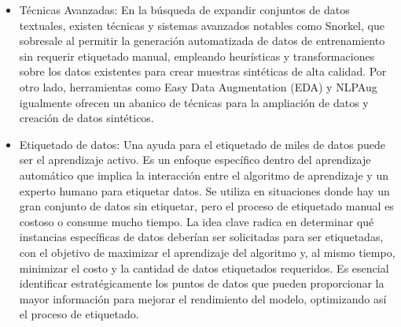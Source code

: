 \begin{itemize}
	\item Técnicas Avanzadas: En la búsqueda de expandir conjuntos de datos textuales, existen técnicas y sistemas avanzados notables como Snorkel, que sobresale al permitir la generación automatizada de datos de entrenamiento sin requerir etiquetado manual, empleando heurísticas y transformaciones sobre los datos existentes para crear muestras sintéticas de alta calidad. Por otro lado, herramientas como Easy Data Augmentation (EDA) y NLPAug igualmente ofrecen un abanico de técnicas para la ampliación de datos y creación de datos sintéticos.
	
	\item Etiquetado de datos: Una ayuda para el etiquetado de miles de datos puede ser el aprendizaje activo. Es un enfoque específico dentro del aprendizaje automático que implica la interacción entre el algoritmo de aprendizaje y un experto humano para etiquetar datos. Se utiliza en situaciones donde hay un gran conjunto de datos sin etiquetar, pero el proceso de etiquetado manual es costoso o consume mucho tiempo. La idea clave radica en determinar qué instancias específicas de datos deberían ser solicitadas para ser etiquetadas, con el objetivo de maximizar el aprendizaje del algoritmo y, al mismo tiempo, minimizar el costo y la cantidad de datos etiquetados requeridos. Es esencial identificar estratégicamente los puntos de datos que pueden proporcionar la mayor información para mejorar el rendimiento del modelo, optimizando así el proceso de etiquetado.

\end{itemize}

